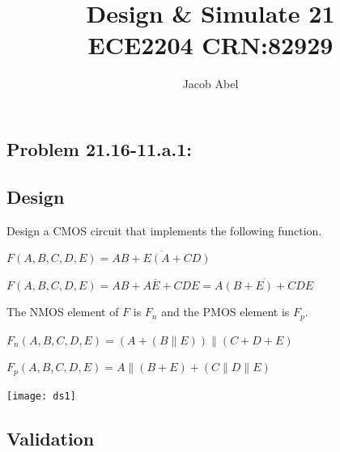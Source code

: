 \documentclass[12pt,letterpaper,titlepage]{article}
\author{Jacob Abel}
\title{	Design \& Simulate 21
	\\\large ECE2204 CRN:82929
}
\begin{document}
\maketitle
\begin{raggedright}
\section{Problem 21.16-11.a.1: } 
\subsection{Design}

Design a CMOS circuit that implements the following function.

$F(A,B,C,D,E) = \overline{AB + E(A+CD)}$

$F(A,B,C,D,E) = \overline{AB + AE + CDE} = \overline{A(B + E) + CDE}$

The NMOS element of $F$ is $F_n$ and the PMOS element is $F_p$.

$F_n(A,B,C,D,E) = (A + (B \parallel E))\parallel (C + D + E)$

$F_p(A,B,C,D,E) = A\parallel(B + E) + (C\parallel D\parallel E)$

\begin{center}
\texttt{[image: ds1]}
\end{center}

\clearpage
\subsection{Validation}


\end{raggedright}
\end{document}
